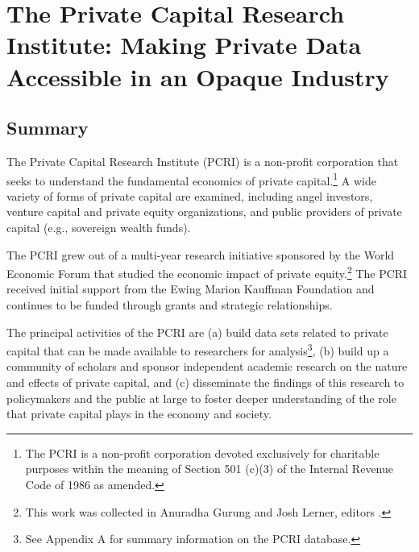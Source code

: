 \hypertarget{pcri}{%
\chapter{The Private Capital Research Institute: Making Private Data Accessible in an Opaque Industry}\label{pcri}}

\hrulefill

\hypertarget{summary-3}{%
\section{Summary}\label{summary-3}}

The Private Capital Research Institute (PCRI) is a non-profit corporation that seeks to understand the fundamental economics of private capital.\footnote{The PCRI is a non-profit corporation devoted exclusively for charitable purposes within the meaning of Section 501 (c)(3) of the Internal Revenue Code of 1986 as amended.} A wide variety of forms of private capital are examined, including angel investors, venture capital and private equity organizations, and public providers of private capital (e.g., sovereign wealth funds).

The PCRI grew out of a multi-year research initiative sponsored by the World Economic Forum that studied the economic impact of private equity.\footnote{This work was collected in Anuradha Gurung and Josh Lerner, editors \citeyearpar{gurung2008}.} The PCRI received initial support from the Ewing Marion Kauffman Foundation and continues to be funded through grants and strategic relationships.

The principal activities of the PCRI are (a) build data sets related to private capital that can be made available to researchers for analysis\footnote{See Appendix A for summary information on the PCRI database.}, (b) build up a community of scholars and sponsor independent academic research on the nature and effects of private capital, and (c) disseminate the findings of this research to policymakers and the public at large to foster deeper understanding of the role that private capital plays in the economy and society.

